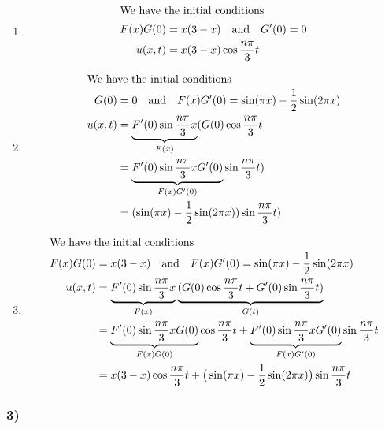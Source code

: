 \documentclass[a4paper]{article}
\newcommand{\ex}[1]{\subsubsection*{#1}}
\begin{document}
\begin{enumerate}[label=\alph*)]
    \item{
            \begin{align}
                \intertext{We have the initial conditions}
                F(x)G(0) &= x(3-x) \quad\text{and}\quad G'(0) = 0
                    \label{eq:2-a-initial} \\
                u(x,t) &= x(3-x) \cos \frac{n\pi}{3}t             
            \end{align}
    }

    \item{
            \begin{align}
                \intertext{We have the initial conditions}
                G(0) &= 0 \quad\text{and}\quad F(x)G'(0) = \sin(\pi x)
                    -\frac{1}{2}\sin(2\pi x) \\ 
                u(x,t) &= \underbrace{F'(0) \sin \frac{n\pi}{3}x}_{F(x)} (G(0)
                    \cos \frac{n\pi}{3}t  \\
                &= \underbrace{F'(0) \sin \frac{n\pi}{3}x
                    G'(0)}_{F(x)G'(0)} \sin \frac{n\pi}{3}t) \\
                &=  (\sin(\pi x) -\frac{1}{2}\sin(2\pi x))\sin \frac{n\pi}{3}t)
            \end{align}
    }

    \item{
            \begin{align}
                \intertext{We have the initial conditions}
                F(x)G(0) &= x(3-x) \quad\text{and}\quad 
                    F(x)G'(0) = \sin(\pi x) - \frac{1}{2} \sin(2\pi x) \\
                u(x,t) &= \underbrace{F'(0) \sin \frac{n\pi}{3}x}_{F(x)}
                    \underbrace{( G(0) \cos \frac{n\pi}{3}t + G'(0) \sin
                    \frac{n\pi}{3}t)}_{G(t)} \\
                &= \underbrace{F'(0) \sin \frac{n\pi}{3}x 
                    G(0)}_{F(x)G(0)}\cos \frac{n\pi}{3}t + \underbrace{F'(0) \sin
                    \frac{n\pi}{3}xG'(0)}_{F(x)G'(0)} \sin \frac{n\pi}{3}t  \\
                &= x(3-x)\cos \frac{n\pi}{3}t + \big(\sin(\pi x)
                    -\frac{1}{2}\sin(2\pi x)\big) \sin \frac{n\pi}{3}t
            \end{align}
    }
\end{enumerate}

\ex{3)}
\end{document}
